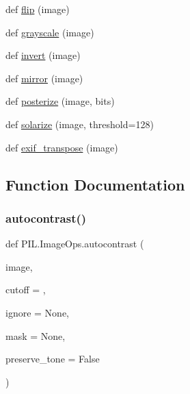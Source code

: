 \begin{DoxyCompactItemize}
\item 
def \hyperlink{namespacePIL_1_1ImageOps_ab61ed57d5fbd69996b56d4b86d807d0e}{flip} (image)
\item 
def \hyperlink{namespacePIL_1_1ImageOps_a0d321a776d6eb99f9e897b0778962c73}{grayscale} (image)
\item 
def \hyperlink{namespacePIL_1_1ImageOps_a8619286122091c6be089d3821e03fb73}{invert} (image)
\item 
def \hyperlink{namespacePIL_1_1ImageOps_a42e210667db8aeb87a999cbb7033908b}{mirror} (image)
\item 
def \hyperlink{namespacePIL_1_1ImageOps_a5941e84a0d076c99b105bdc8039df8b5}{posterize} (image, bits)
\item 
def \hyperlink{namespacePIL_1_1ImageOps_a50420e7239e43ed1ed190fdf84771bcc}{solarize} (image, threshold=128)
\item 
def \hyperlink{namespacePIL_1_1ImageOps_ad992424186ace22f9fc9e85f20f1fbe3}{exif\+\_\+transpose} (image)
\end{DoxyCompactItemize}


\subsection{Function Documentation}
\mbox{\label{namespacePIL_1_1ImageOps_afe76c6114e2b0f82a03f4654a5267574}} 
\subsubsection{\texorpdfstring{autocontrast()}{autocontrast()}}
{\footnotesize\ttfamily def P\+I\+L.\+Image\+Ops.\+autocontrast (\begin{DoxyParamCaption}\item[{}]{image,  }\item[{}]{cutoff = {},  }\item[{}]{ignore = {\ttfamily None},  }\item[{}]{mask = {\ttfamily None},  }\item[{}]{preserve\+\_\+tone = {\ttfamily False} }\end{DoxyParamCaption})}

